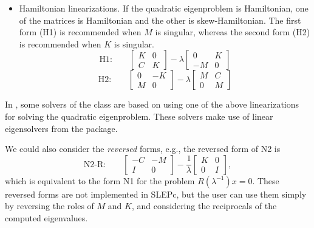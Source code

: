 \begin{itemize}
\medskip
\item Hamiltonian linearizations. If the quadratic eigenproblem is Hamiltonian, one of the matrices is Hamiltonian and the other is skew-Hamiltonian. The first form (H1) is recommended when $M$ is singular, whereas the second form (H2) is recommended when $K$ is singular.
\begin{equation}
\label{eq:h1}
\mbox{H1:}\qquad
\left[\begin{array}{cc}K & 0\\C & K\end{array}\right]-\lambda\left[\begin{array}{cc} 0 & K\\-M & 0\end{array}\right]
\end{equation}
\begin{equation}
\label{eq:h2}
\mbox{H2:}\qquad
\left[\begin{array}{cc}0 & -K\\M & 0\end{array}\right]-\lambda\left[\begin{array}{cc}M & C\\ 0 & M\end{array}\right]
\end{equation}
\end{itemize}

In \slepc, some solvers of the  class are based on using one of the above linearizations for solving the quadratic eigenproblem. These solvers make use of linear eigensolvers from the  package.

We could also consider the \emph{reversed} forms, e.g., the reversed form of N2 is
\begin{equation}
\label{eq:n2r}
\mbox{N2-R:}\qquad
\left[\begin{array}{cc}-C & -M\\I & 0\end{array}\right]-\frac{1}{\lambda}\left[\begin{array}{cc}K & 0\\0 & I\end{array}\right],
\end{equation}
which is equivalent to the form N1 for the problem $R(\lambda^{-1})x=0$. These reversed forms are not implemented in SLEPc, but the user can use them simply by reversing the roles of $M$ and $K$, and considering the reciprocals of the computed eigenvalues.

